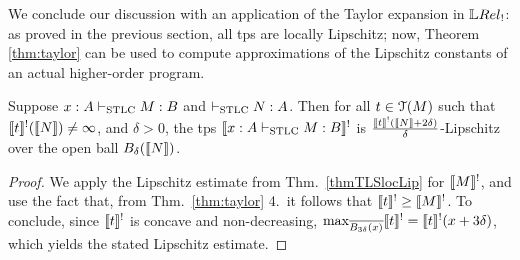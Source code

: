 We conclude our discussion with an application of the Taylor expansion in $\LREL_{!}$: as proved in the previous section, all tps are locally Lipschitz; now, Theorem \ref{thm:taylor} can be used to compute approximations of the Lipschitz constants of an actual higher-order program.

\begin{corollary}
Suppose $x: A \vdash_{\mathrm{STLC}}M:B$ and $\vdash_{\mathrm{STLC}} N:A$. 
Then for all $t\in \mathcal{T}(M)$ such that $\llbracket t\rrbracket^{!}(\llbracket N\rrbracket)\neq \infty$, and $\delta>0$, the tps $\llbracket x:A\vdash_{\mathrm{STLC}}M:B\rrbracket^{!}$ is $\frac{\llbracket t\rrbracket^{!}(\llbracket N\rrbracket+2\delta)}{\delta}$-Lipschitz over the open ball
 $B_{\delta}(\llbracket N\rrbracket)$.
\end{corollary}
\begin{proof}
We apply the Lipschitz estimate from Thm.~\ref{thmTLSlocLip} for $\llbracket M\rrbracket^{!}$,  and use the fact that, from Thm.~\ref{thm:taylor} 4.~it follows that $\llbracket t\rrbracket^{!}\geq \llbracket M\rrbracket^{!}$.
To conclude, since $\llbracket t\rrbracket^{!}$ is concave and non-decreasing, $\max_{\overline{B_{3\delta}(x)}}\llbracket t\rrbracket^{!}= \llbracket t\rrbracket^{!}(x+3\delta)$, which yields the stated Lipschitz estimate. 
\end{proof}

